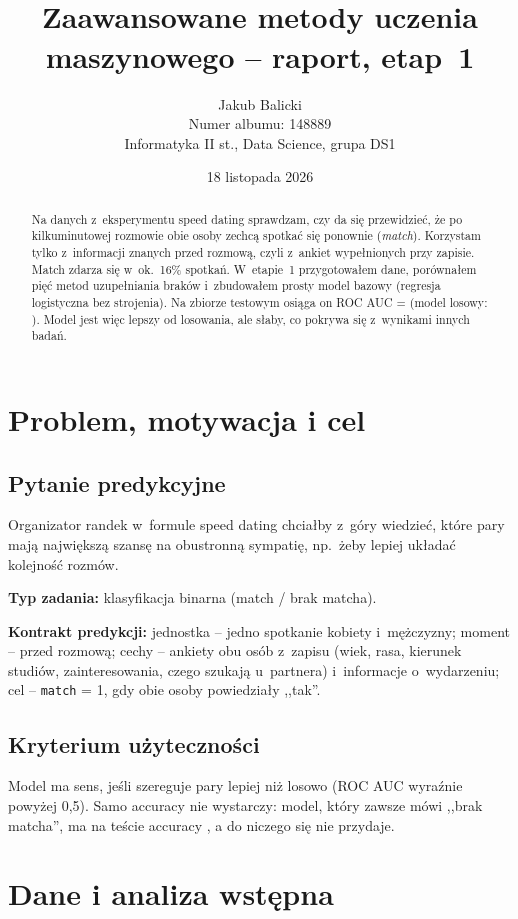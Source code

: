 \documentclass[10pt,twocolumn,a4paper]{article}
\title{\TematProjektu\\[2mm]
\large Zaawansowane metody uczenia maszynowego -- raport, etap~1}
\author{Jakub Balicki\\\small Numer albumu: 148889\\\small Informatyka II st., Data Science, grupa DS1}
\date{18 listopada 2026}
\newcommand{\TypZadania}{klasyfikacja binarna (match / brak matcha)}
\begin{document}
\maketitle

\begin{abstract}
Na danych z~eksperymentu speed dating sprawdzam, czy da się przewidzieć,
że po kilkuminutowej rozmowie obie osoby zechcą spotkać się ponownie (\emph{match}).
Korzystam tylko z~informacji znanych przed rozmową, czyli z~ankiet wypełnionych
przy zapisie. Match zdarza się w~ok.\ 16\% spotkań. W~etapie~1 przygotowałem dane,
porównałem pięć metod uzupełniania braków i~zbudowałem prosty model bazowy
(regresja logistyczna bez strojenia). Na zbiorze testowym osiąga on ROC AUC =
\TestAuc{} (model losowy: \DummyAuc{}). Model jest więc lepszy od losowania, ale słaby,
co pokrywa się z~wynikami innych badań.
\end{abstract}

\section{Problem, motywacja i cel}
\subsection{Pytanie predykcyjne}
Organizator randek w~formule speed dating chciałby z~góry wiedzieć, które pary mają
największą szansę na obustronną sympatię, np.\ żeby lepiej układać kolejność rozmów.

\noindent\textbf{Typ zadania:} \TypZadania.

\noindent\textbf{Kontrakt predykcji:} jednostka -- jedno spotkanie kobiety i~mężczyzny;
moment -- przed rozmową; cechy -- ankiety obu osób z~zapisu (wiek, rasa, kierunek
studiów, zainteresowania, czego szukają u~partnera) i~informacje o~wydarzeniu;
cel -- \texttt{match} = 1, gdy obie osoby powiedziały ,,tak''.

\subsection{Kryterium użyteczności}
Model ma sens, jeśli szereguje pary lepiej niż losowo (ROC AUC wyraźnie powyżej 0,5).
Samo accuracy nie wystarczy: model, który zawsze mówi ,,brak matcha'', ma na teście
accuracy \AlwaysNoAcc{}, a do niczego się nie przydaje.

\section{Dane i analiza wstępna}
\end{document}
